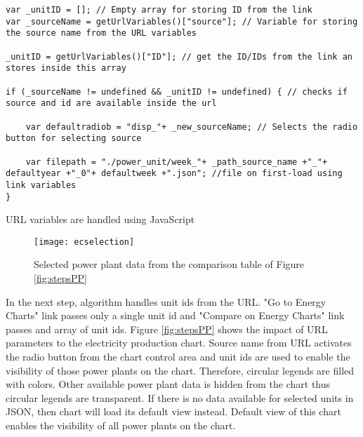 \begin{Listing}
\begin{lstlisting}
var _unitID = []; // Empty array for storing ID from the link 
var _sourceName = getUrlVariables()["source"]; // Variable for storing the source name from the URL variables

_unitID = getUrlVariables()["ID"]; // get the ID/IDs from the link an stores inside this array

if (_sourceName != undefined && _unitID != undefined) { // checks if source and id are available inside the url

	var defaultradiob = "disp_"+ _new_sourceName; // Selects the radio button for selecting source

	var filepath = "./power_unit/week_"+ _path_source_name +"_"+ defaultyear +"_0"+ defaultweek +".json"; //file on first-load using link variables
}

\end{lstlisting}
\caption{URL variables are handled using JavaScript}
\label{lst:url-json}
\end{Listing}

\begin{figure}
\centering
\texttt{[image: ecselection]}
\caption{Selected power plant data from the comparison table of Figure \ref{fig:stepsPP}}
\label{fig:ecselect}
\end{figure}

In the next step, algorithm handles unit ids from the URL. "Go to Energy Charts" link passes only a single unit id and "Compare on Energy Charts" link passes and array of unit ids. Figure \ref{fig:stepsPP} shows the impact of URL parameters to the electricity production chart. Source name from URL activates the radio button from the chart control area and unit ids are used to enable the visibility of those power plants on the chart. Therefore, circular legends are filled with colors. Other available power plant data is hidden from the chart thus circular legends are transparent. If there is no data available for selected units in JSON, then chart will load its default view instead. Default view of this chart enables the visibility of all power plants on the chart. 

%
%
%	
%	
%	
%

